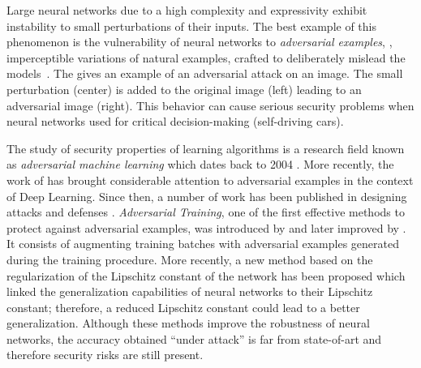 Large neural networks due to a high complexity and expressivity exhibit instability to small perturbations of their inputs.
The best example of this phenomenon is the vulnerability of neural networks to \emph{adversarial examples}, \ie, imperceptible variations of natural examples, crafted to deliberately mislead the models~\cite{globerson2006nightmare,biggio2013evasion,szegedy2013intriguing}.
The  gives an example of an adversarial attack on an image.
The small perturbation (center) is added to the original image (left) leading to an adversarial image (right).
This behavior can cause serious security problems when neural networks used for critical decision-making (\eg self-driving cars).


The study of security properties of learning algorithms is a research field known as \emph{adversarial machine learning} which dates back to 2004 \cite{dalvi2004adversarial}.
More recently, the work of \citet{szegedy2013intriguing} has brought considerable attention to adversarial examples in the context of Deep Learning.
Since then, a number of work has been published in designing attacks and defenses \cite{szegedy2013intriguing,goodfellow2014explaining,papernot2016limitations,madry2018towards,carlini2017towards,pinot2019theoretical}.
\emph{Adversarial Training}, one of the first effective methods to protect against adversarial examples, was introduced by \citet{goodfellow2014explaining} and later improved by \citet{madry2018towards}.
It consists of augmenting training batches with adversarial examples generated during the training procedure.
More recently, a new method \cite{farnia2018generalizable} based on the regularization of the Lipschitz constant of the network has been proposed which linked the generalization capabilities of neural networks to their Lipschitz constant; therefore, a reduced Lipschitz constant could lead to a better generalization.
Although these methods improve the robustness of neural networks, the accuracy obtained ``under attack'' is far from state-of-art and therefore security risks are still present. 

